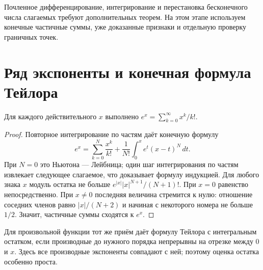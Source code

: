 Почленное дифференцирование, интегрирование и перестановка бесконечного числа слагаемых требуют дополнительных теорем. На этом этапе используем конечные частичные суммы, уже доказанные признаки и отдельную проверку граничных точек.


\section{Ряд экспоненты и конечная формула Тейлора}
\begin{theorem}
Для каждого действительного \(x\) выполнено \(e^x=\sum_{k=0}^\infty x^k/k!\).
\end{theorem}
\begin{proof}Повторное интегрирование по частям даёт конечную формулу
\[
e^x=\sum_{k=0}^N\frac{x^k}{k!}+\frac1{N!}\int_0^x e^t(x-t)^N\,dt.
\]
При \(N=0\) это Ньютона — Лейбница; один шаг интегрирования по частям извлекает следующее слагаемое, что доказывает формулу индукцией. Для любого знака \(x\) модуль остатка не больше \(e^{|x|}|x|^{N+1}/(N+1)!\). При \(x=0\) равенство непосредственно. При \(x\ne0\) последняя величина стремится к нулю: отношение соседних членов равно \(|x|/(N+2)\) и начиная с некоторого номера не больше \(1/2\). Значит, частичные суммы сходятся к \(e^x\).\end{proof}
Для произвольной функции тот же приём даёт формулу Тейлора с интегральным остатком, если производные до нужного порядка непрерывны на отрезке между \(0\) и \(x\). Здесь все производные экспоненты совпадают с ней; поэтому оценка остатка особенно проста.

